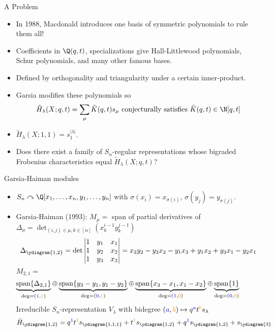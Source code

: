 \documentclass[dvipsnames]{beamer}
\renewcommand{\Span}{\operatorname{span}}
\theoremstyle{definition}
\newcounter{c}
\begin{document}
\begin{frame}{A Problem}
  \begin{itemize}
  \item In 1988, Macdonald introduces one basis of symmetric
    polynomials to rule them all!\pause
  \item Coefficients in \(\Q(q,t)\), specializations give
    Hall-Littlewood polynomials, Schur polynomials, and many other famous bases.\pause
  \item Defined by orthogonality and triangularity under a certain
    inner-product. \pause
  \item Garsia modifies these polynomials so 
    \[
      \tilde{H}_\lambda(X;q,t) = \sum_\mu \tilde{K}(q,t) s_\mu \text{
        conjecturally satisfies }\tilde{K}(q,t) \in \N[q,t]
    \]\pause
  \item \(\tilde{H}_\lambda(X;1,1) = s_1^{|\lambda|}\).\pause
  \item Does there
    exist a family of \(S_n\)-regular representations whose bigraded
    Frobenius characteristics equal \(\tilde{H}_\lambda(X;q,t)\)?
  \end{itemize}
\end{frame}
\begin{frame}{Garsia-Haiman modules}
  \begin{itemize}
  \item \(S_n \curvearrowright \Q[x_1,\ldots,x_n,y_1,\ldots,y_n]\) with 
    \(\sigma(x_i) = x_{\sigma(i)}\), \(\sigma(y_j) = y_{\sigma(j)}\).\pause
  \item Garsia-Haiman (1993): \(M_\mu = \) span of partial derivatives of
    \(\Delta_\mu = \det_{(i,j) \in \mu, k \in [n]} (x_k^{i-1} y_k^{j-1})\) \pause \[
      \Delta_{\ydiagram{1,2}} = \det \left|
        \begin{matrix}
          1 & y_1 & x_1 \\
          1 & y_2 & x_2 \\
          1 & y_3 & x_3
        \end{matrix}
      \right| = x_3 y_2 - y_3 x_2 - y_1 x_3 + y_1 x_2 + y_3 x_1 - y_2 x_1
    \]
    \pause
    \(M_{2,1} = \)
  \[
    \hspace{-3em}
      \underbrace{\Span\{\Delta_{2,1}\}}_{\deg = (\textcolor{blue}{1},\textcolor{orange}{1})}
      \oplus \underbrace{\Span\{y_3-y_1, y_1 - y_2\}}_{\deg = (\textcolor{blue}{0},\textcolor{orange}{1})}
      \oplus \underbrace{\Span\{x_3-x_1, x_1 - x_2\}}_{\deg =  (\textcolor{blue}{1},\textcolor{orange}{0})}
      \oplus \underbrace{\Span \{1\}}_{\deg = (\textcolor{blue}{0},\textcolor{orange}{0})}
    \]
    \pause
    Irreducible \(S_n\)-representation \(V_\lambda\) with bidegree \((\textcolor{blue}{a},\textcolor{orange}{b}) \mapsto
    q^{\textcolor{blue}{a}}t^{\textcolor{orange}{b}} s_\lambda\) \pause \[
      \tilde{H}_{\ydiagram{1,2}} = q^{\textcolor{blue}{1}}t^{\textcolor{orange}{1}} s_{\ydiagram{1,1,1}} + t^{\textcolor{orange}{1}}
      s_{\ydiagram{1,2}} + q^{\textcolor{blue}{1}} s_{\ydiagram{1,2}} + s_{\ydiagram{3}}
    \]
  \end{itemize}
\end{frame}
\end{document}
